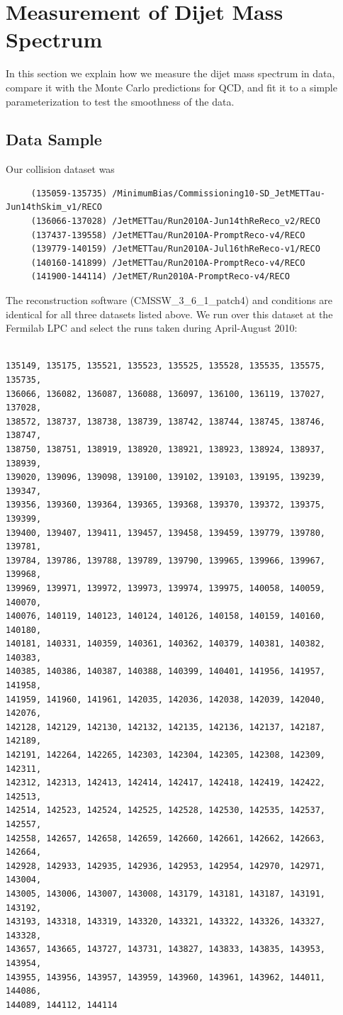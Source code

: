 \section{Measurement of Dijet Mass Spectrum}

In this section we explain how we measure the 
dijet mass spectrum in data, compare it with
the Monte Carlo predictions for QCD, and fit it
to a simple parameterization to test the smoothness 
of the data.

\subsection{Data Sample}

Our collision dataset was 
\begin{verbatim}
     (135059-135735) /MinimumBias/Commissioning10-SD_JetMETTau-Jun14thSkim_v1/RECO
     (136066-137028) /JetMETTau/Run2010A-Jun14thReReco_v2/RECO
     (137437-139558) /JetMETTau/Run2010A-PromptReco-v4/RECO
     (139779-140159) /JetMETTau/Run2010A-Jul16thReReco-v1/RECO
     (140160-141899) /JetMETTau/Run2010A-PromptReco-v4/RECO
     (141900-144114) /JetMET/Run2010A-PromptReco-v4/RECO 
\end{verbatim}
The reconstruction software (CMSSW\_3\_6\_1\_patch4) and conditions are identical for all three datasets listed above.
We run over this dataset at the Fermilab LPC and select the runs taken during
April-August 2010:
\begin{verbatim}

135149, 135175, 135521, 135523, 135525, 135528, 135535, 135575, 135735,
136066, 136082, 136087, 136088, 136097, 136100, 136119, 137027, 137028,
138572, 138737, 138738, 138739, 138742, 138744, 138745, 138746, 138747,
138750, 138751, 138919, 138920, 138921, 138923, 138924, 138937, 138939, 
139020, 139096, 139098, 139100, 139102, 139103, 139195, 139239, 139347, 
139356, 139360, 139364, 139365, 139368, 139370, 139372, 139375, 139399, 
139400, 139407, 139411, 139457, 139458, 139459, 139779, 139780, 139781, 
139784, 139786, 139788, 139789, 139790, 139965, 139966, 139967, 139968, 
139969, 139971, 139972, 139973, 139974, 139975, 140058, 140059, 140070, 
140076, 140119, 140123, 140124, 140126, 140158, 140159, 140160, 140180, 
140181, 140331, 140359, 140361, 140362, 140379, 140381, 140382, 140383, 
140385, 140386, 140387, 140388, 140399, 140401, 141956, 141957, 141958, 
141959, 141960, 141961, 142035, 142036, 142038, 142039, 142040, 142076, 
142128, 142129, 142130, 142132, 142135, 142136, 142137, 142187, 142189, 
142191, 142264, 142265, 142303, 142304, 142305, 142308, 142309, 142311, 
142312, 142313, 142413, 142414, 142417, 142418, 142419, 142422, 142513, 
142514, 142523, 142524, 142525, 142528, 142530, 142535, 142537, 142557, 
142558, 142657, 142658, 142659, 142660, 142661, 142662, 142663, 142664, 
142928, 142933, 142935, 142936, 142953, 142954, 142970, 142971, 143004, 
143005, 143006, 143007, 143008, 143179, 143181, 143187, 143191, 143192, 
143193, 143318, 143319, 143320, 143321, 143322, 143326, 143327, 143328, 
143657, 143665, 143727, 143731, 143827, 143833, 143835, 143953, 143954, 
143955, 143956, 143957, 143959, 143960, 143961, 143962, 144011, 144086, 
144089, 144112, 144114
\end{verbatim}
